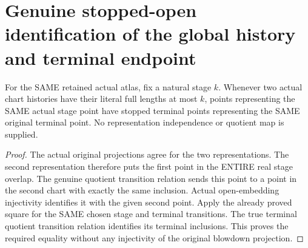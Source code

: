 \section{Genuine stopped-open identification of the global history and terminal endpoint}

\begin{lemma}
\label{hir:sharp-actual-curve-stopped-local-quotient-independence}
\leanok
For the SAME retained actual atlas, fix a natural stage $k$. Whenever
two actual chart histories have their literal full lengths at most $k$,
points representing the SAME actual stage point have stopped terminal
points representing the SAME original terminal point. No representation
independence or quotient map is supplied.
\end{lemma}
\begin{proof}
The actual original projections agree for the two representations. The
second representation therefore puts the first point in the ENTIRE real
stage overlap. The genuine quotient transition relation sends this point
to a point in the second chart with exactly the same inclusion. Actual
open-embedding injectivity identifies it with the given second point.
Apply the already proved square for the SAME chosen stage and terminal
transitions. The true terminal quotient transition relation identifies
its terminal inclusions. This proves the required equality without any
injectivity of the original blowdown projection.
\end{proof}

